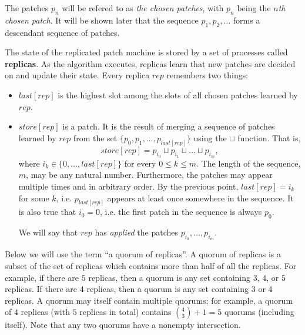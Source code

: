\documentclass[12pt,a4paper,en]{pracamgr}
\newcommand{\tb}[1]{\textbf{#1}}
\newcommand{\ti}[1]{\textit{#1}}
\begin{document}
The patches $p_n$ will be refered to as \ti{the chosen patches}, with $p_n$ being the \ti{$n$th chosen patch}. It will be shown later that the sequence $p_1, p_2, \dots$ forms a descendant sequence of patches.

The state of the replicated patch machine is stored by a set of processes called \tb{replicas}. As the algorithm executes, replicas learn that new patches are decided on and update their state. Every replica $rep$ remembers two things:
\begin{itemize}
    \item $last[rep]$ is the highest slot among the slots of all chosen patches learned by $rep$.
    \item $store[rep]$ is a patch. It is the result of merging a sequence of patches learned by $rep$ from the set $\{p_0, p_1, \dots, p_{last[rep]}\}$ using the $\sqcup$ function. That is,
        $$ store[rep] = p_{i_0} \sqcup p_{i_1} \sqcup \dots \sqcup p_{i_m}, $$
        where $i_k \in \{0, \dots, last[rep]\}$ for every $0 \le k \le m$. The length of the sequence, $m$, may be any natural number. Furthermore, the patches may appear multiple times and in arbitrary order. By the previous point, $last[rep] = i_k$ for some $k$, i.e. $p_{last[rep]}$ appears at least once somewhere in the sequence. It is also true that $i_0 = 0$, i.e. the first patch in the sequence is always $p_0$.

        We will say that $rep$ has \ti{applied} the patches $p_{i_0}, \dots, p_{i_m}$.
\end{itemize}

Below we will use the term ``a quorum of replicas''. A quorum of replicas is a subset of the set of replicas which contains more than half of all the replicas. For example, if there are $5$ replicas, then a quorum is any set containing $3$, $4$, or $5$ replicas. If there are $4$ replicas, then a quorum is any set containing $3$ or $4$ replicas. A quorum may itself contain multiple quorums; for example, a quorum of $4$ replicas (with $5$ replicas in total) contains ${4 \choose 3} + 1 = 5$ quorums (including itself). Note that any two quorums have a nonempty intersection.
\end{document}
